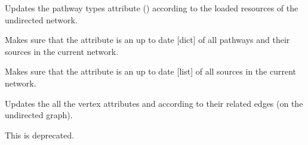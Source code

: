\documentclass[letterpaper,10pt,english]{sphinxmanual}
\begin{document}
\begin{fulllineitems}

\begin{fulllineitems}
\label{\detokenize{main:pypath.main.PyPath.update_pathway_types}}
Updates the pathway types attribute
() according to the
loaded resources of the undirected network.

\end{fulllineitems}


\begin{fulllineitems}
\label{\detokenize{main:pypath.main.PyPath.update_pathways}}
Makes sure that the 
attribute is an up to date {[}dict{]} of all pathways and their
sources in the current network.

\end{fulllineitems}


\begin{fulllineitems}
\label{\detokenize{main:pypath.main.PyPath.update_sources}}
Makes sure that the 
attribute is an up to date {[}list{]} of all sources in the current
network.

\end{fulllineitems}


\begin{fulllineitems}
\label{\detokenize{main:pypath.main.PyPath.update_vertex_sources}}
Updates the all the vertex attributes  and
 according to their related edges (on the
undirected graph).

\end{fulllineitems}


\begin{fulllineitems}
\label{\detokenize{main:pypath.main.PyPath.update_vindex}}
This is deprecated.


\end{fulllineitems}
\end{fulllineitems}
\end{document}
